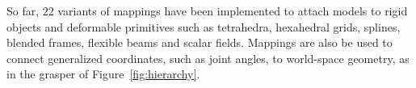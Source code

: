 %
So far, $22$ variants of mappings have been implemented to attach models to rigid objects and deformable primitives such as tetrahedra, hexahedral grids, splines, blended frames, flexible beams and scalar fields.
Mappings are also be used to connect generalized coordinates, such as joint angles, to world-space geometry, as in the grasper of Figure~\ref{fig:hierarchy}.


%
%


